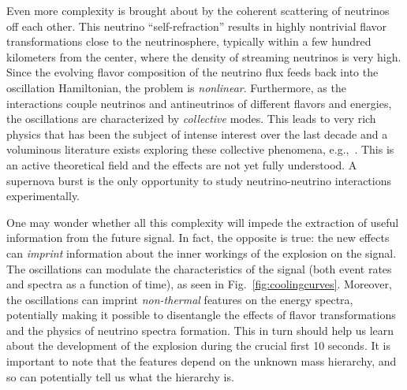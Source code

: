 Even more complexity is brought about by the coherent scattering of neutrinos off each other. This neutrino ``self-refraction'' 
 results in highly nontrivial flavor transformations close to the neutrinosphere, typically within a few hundred kilometers from the center, where the density of streaming neutrinos is very high. Since the evolving flavor composition of the neutrino flux feeds back into the oscillation Hamiltonian, the problem is \emph{nonlinear}. Furthermore, as the interactions couple neutrinos and antineutrinos of different flavors and energies, the oscillations are characterized by \emph{collective} modes.    This leads to very rich physics that has been the subject of intense interest over the last decade and a voluminous literature exists exploring these collective phenomena,
e.g.,~\cite{Duan:2005cp,Fogli:2007bk,Raffelt:2007cb,Raffelt:2007xt,EstebanPretel:2008ni,Duan:2009cd,Dasgupta:2009mg,Duan:2010bg,Duan:2010bf,Wu:2014kaa}.  This is an active theoretical field and the effects are not yet fully understood. A supernova burst is the only opportunity to study neutrino-neutrino interactions experimentally.


One may wonder whether all this complexity will impede the extraction of useful information from the future signal. In fact, the opposite is true: the new effects can \emph{imprint} information about the inner workings of the explosion on the signal. The oscillations can modulate the characteristics of the signal (both event rates and spectra as a function of time), as seen in Fig.~\ref{fig:coolingcurves}. Moreover, the oscillations can imprint \emph{non-thermal} features on the energy spectra, potentially making it possible to disentangle the effects of flavor transformations and the physics of neutrino spectra formation. This in turn should help us learn about the development of the explosion during the crucial first 10 seconds.   It is important to note that the features depend on the unknown mass hierarchy, and so can potentially tell us what the hierarchy is.

